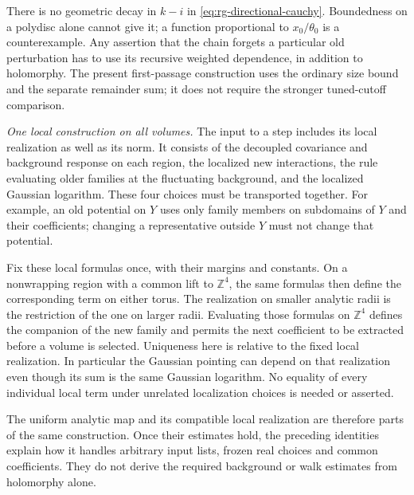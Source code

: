 \documentclass[11pt,letterpaper,reqno]{amsart}
\theoremstyle{definition}
\theoremstyle{remark}
\begin{document}
There is no geometric decay in $k-i$ in
\eqref{eq:rg-directional-cauchy}. Boundedness on a polydisc alone
cannot give it; a function proportional to $x_0/\theta_0$ is a
counterexample. Any assertion that the chain forgets a particular
old perturbation has to use its recursive weighted dependence, in
addition to holomorphy. The present first-passage construction uses
the ordinary size bound and the separate remainder sum; it does not
require the stronger tuned-cutoff comparison.

\emph{One local construction on all volumes.}
The input to a step includes its local realization as well as its
norm. It consists of the decoupled covariance and background response
on each region, the localized new interactions, the rule evaluating
older families at the fluctuating background, and the localized
Gaussian logarithm. These four choices must be transported together.
For example, an old potential on $Y$ uses only family members on
subdomains of $Y$ and their coefficients; changing a representative
outside $Y$ must not change that potential.

Fix these local formulas once, with their margins and constants.
On a nonwrapping region with a common lift to $\mathbb Z^4$, the
same formulas then define the corresponding term on either torus.
The realization on smaller analytic radii is the restriction of the
one on larger radii. Evaluating those formulas on $\mathbb Z^4$
defines the companion of the new family and permits the next
coefficient to be extracted before a volume is selected. Uniqueness
here is relative to the fixed local realization. In particular the
Gaussian pointing can depend on that realization even though its
sum is the same Gaussian logarithm. No equality of every individual
local term under unrelated localization choices is needed or asserted.

The uniform analytic map and its compatible local realization are
therefore parts of the same construction. Once their estimates hold,
the preceding identities explain how it handles arbitrary input lists,
frozen real choices and common coefficients. They do not derive the
required background or walk estimates from holomorphy alone.
\end{document}
